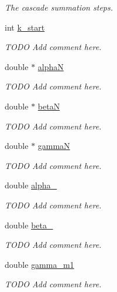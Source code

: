 \begin{DoxyCompactItemize}
\begin{DoxyCompactList}\small\item\em The cascade summation steps. \end{DoxyCompactList}\item 
int \hyperlink{structfpt__data___aeed5a13bcd0301058d37d0446d735334}{k\-\_\-start}
\begin{DoxyCompactList}\small\item\em T\-O\-D\-O Add comment here. \end{DoxyCompactList}\item 
double $\ast$ \hyperlink{structfpt__data___a8474f38ec1ed4d1c41235de523fc2519}{alpha\-N}
\begin{DoxyCompactList}\small\item\em T\-O\-D\-O Add comment here. \end{DoxyCompactList}\item 
double $\ast$ \hyperlink{structfpt__data___ae62530023226d004ccaa18f4e1565e8d}{beta\-N}
\begin{DoxyCompactList}\small\item\em T\-O\-D\-O Add comment here. \end{DoxyCompactList}\item 
double $\ast$ \hyperlink{structfpt__data___a606df2fa8fb3173a8ced31366b0bcc8a}{gamma\-N}
\begin{DoxyCompactList}\small\item\em T\-O\-D\-O Add comment here. \end{DoxyCompactList}\item 
double \hyperlink{structfpt__data___ae7491902143322ce74a8cccfa5ec7b3e}{alpha\-\_}
\begin{DoxyCompactList}\small\item\em T\-O\-D\-O Add comment here. \end{DoxyCompactList}\item 
double \hyperlink{structfpt__data___a4639c4494938cad8b0536191ca2eefaa}{beta\-\_}
\begin{DoxyCompactList}\small\item\em T\-O\-D\-O Add comment here. \end{DoxyCompactList}\item 
double \hyperlink{structfpt__data___aa8dd07acd6d154b929423231b4b2847a}{gamma\-\_\-m1}
\begin{DoxyCompactList}\small\item\em T\-O\-D\-O Add comment here. \end{DoxyCompactList}\item 

\end{DoxyCompactItemize}
